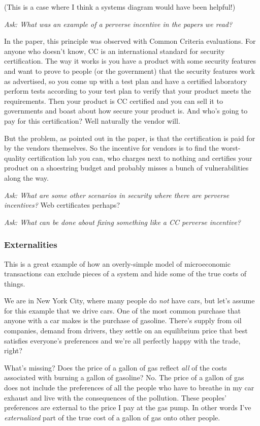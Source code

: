 \documentclass[11pt]{article}
\begin{document}
(This is a case where I think a systems diagram would have been helpful!)

{\it Ask: What was an example of a perverse incentive in the papers we read? }

In the paper, this principle was observed with Common Criteria evaluations. For anyone who doesn’t know, CC is an international standard for security certification. The way it works is you have a product with some security features and want to prove to people (or the government) that the security features work as advertised, so you come up with a test plan and have a certified laboratory perform tests according to your test plan to verify that your product meets the requirements. Then your product is CC certified and you can sell it to governments and boast about how secure your product is. And who’s going to pay for this certification? Well naturally the vendor will. 

But the problem, as pointed out in the paper, is that the certification is paid for by the vendors themselves. So the incentive for vendors is to find the worst-quality certification lab you can, who charges next to nothing and certifies your product on a shoestring budget and probably misses a bunch of vulnerabilities along the way. 

{\it Ask: What are some other scenarios in security where there are perverse incentives?} Web certificates perhaps?

{\it Ask: What can be done about fixing something like a CC perverse incentive?}


\subsubsection{Externalities}

This is a great example of how an overly-simple model of microeconomic transactions can exclude pieces of a system and hide some of the true costs of things.

We are in New York City, where many people do {\it not} have cars, but let's assume for this example that we drive cars. One of the most common purchase that anyone with a car makes is the purchase of gasoline. There's supply from oil companies, demand from drivers, they settle on an equilibrium price that best satisfies everyone's preferences and we're all perfectly happy with the trade, right?

What's missing? Does the price of a gallon of gas reflect {\it all} of the costs associated with burning a gallon of gasoline?
No. The price of a gallon of gas does not include the preferences of all the people who have to breathe in my car exhaust and live with the consequences of the pollution. These peoples' preferences are external to the price I pay at the gas pump. In other words I've {\it externalized} part of the true cost of a gallon of gas onto other people.
\end{document}
